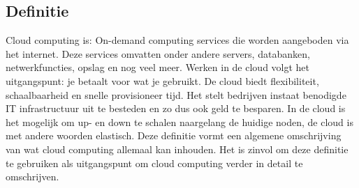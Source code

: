 \subsection{Definitie}

Cloud computing is:
\newline
On-demand computing services die worden aangeboden via het internet. Deze services omvatten onder andere servers, databanken, netwerkfuncties, opslag en nog veel meer. Werken in de cloud volgt het uitgangspunt: je betaalt voor wat je gebruikt. De cloud biedt flexibiliteit, schaalbaarheid en snelle provisioneer tijd. Het stelt bedrijven instaat benodigde IT infrastructuur uit te besteden en zo dus ook geld te besparen. In de cloud is het mogelijk om up- en down te schalen naargelang de huidige noden, de cloud is met andere woorden elastisch. \autocite{Davis2017}
\newline
\newline
Deze definitie vormt een algemene omschrijving van wat cloud computing allemaal kan inhouden. Het is zinvol om deze definitie te gebruiken als uitgangspunt om cloud computing verder in detail te omschrijven.

